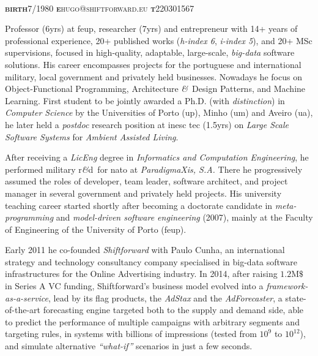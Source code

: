 \documentclass[9pt, a4paper, pstricks]{article}
\newcommand{\amper}{{\fontspec[Scale=.95]{Hoefler Text}\selectfont\itshape\&}}
\newcommand{\years}[1]{\marginnote{\small #1}}
\newcommand{\marginimage}{
}
\newcommand{\acr}[1]{{\sc #1}}
\newcommand{\rnd}{{\sc r\amper d}~}
\begin{document}

{\huge\sc{}}\\
{\small {\scshape  {\bfseries birth}\hspace{2mm}7/1980 \hspace{7mm} {\bfseries e}\hspace{2mm}hugo@shiftforward.eu \hspace{7mm} {\bfseries t}\hspace{2mm}220301567}}\\

\years{\vspace{-4mm}\\\hspace*{-10mm}\texttt{[image: qrcode.eps]}}\marginimage{\small Professor (6yrs) at {\sc feup}, researcher (7yrs) and entrepreneur with 14+ years of professional experience, 20+ published works (\emph{h-index 6}, \emph{i-index 5}), and 20+ MSc supervisions, focused in high-quality, adaptable, large-scale, \emph{big-data} software solutions. His career encompasses projects for the portuguese and international military, local government and privately held businesses. Nowadays he focus on Object-Functional Programming, Architecture \amper~Design Patterns, and Machine Learning. First student to be jointly awarded a Ph.D. (with \emph{distinction}) in \emph{Computer Science} by the Universities of Porto {\sc (up)}, Minho {\sc (um)} and Aveiro {\sc (ua)}, he later held a \emph{postdoc} research position at \acr{inesc tec} (1.5yrs) on \emph{Large Scale Software Systems} for \emph{Ambient Assisted Living}.

\vspace{1mm}After receiving a \emph{LicEng} degree in \emph{Informatics and Computation Engineering}, he performed military \rnd for \acr{nato} at \emph{ParadigmaXis, S.A.} There he progressively assumed the roles of developer, team leader, software architect, and project manager in several government and privately held projects. His university teaching career started shortly after becoming a doctorate candidate in \emph{meta-programming} and \emph{model-driven software engineering} (2007), mainly at the Faculty of Engineering of the University of Porto (\acr{feup}).

\vspace{1mm}Early 2011 he co-founded \emph{Shiftforward} with Paulo Cunha, an international strategy and technology consultancy company specialised in big-data software infrastructures for the Online Advertising industry. In 2014, after raising $1.2$M$\$$ in Series A VC funding, Shiftforward's business model evolved into a \emph{framework-as-a-service}, lead by its flag products, the \emph{AdStax} and the \emph{AdForecaster}, a state-of-the-art forecasting engine targeted both to the supply and demand side, able to predict the performance of multiple campaigns with arbitrary segments and targeting rules, in systems with billions of impressions (tested from $10^9$ to $10^{12}$), and simulate alternative \emph{``what-if''} scenarios in just a few seconds.}
\end{document}
